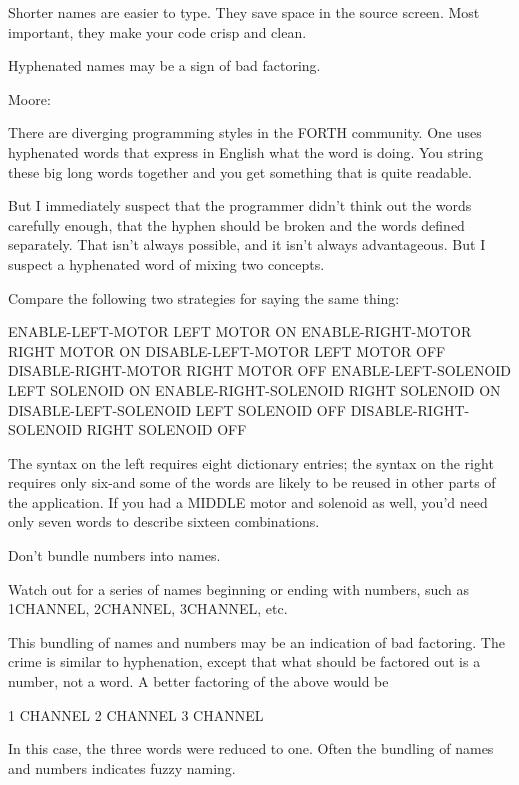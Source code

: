 Shorter names are easier to type.  They save space in the source
screen.  Most important, they make your code crisp and clean.

\begin{tip}
Hyphenated names may be a sign of bad factoring.
\end{tip}
Moore:

There are diverging programming styles in the FORTH community.  One
uses hyphenated words that express in English what the word is doing.
You string these big long words together and you get something that is
quite readable.

But I immediately suspect that the programmer didn't think out the words
carefully enough, that the hyphen should be broken and the words defined
separately.  That isn't always possible, and it isn't always advantageous.
But I suspect a hyphenated word of mixing two concepts.

Compare the following two strategies for saying the same thing:
\begin{Code}
ENABLE-LEFT-MOTOR        LEFT MOTOR ON
ENABLE-RIGHT-MOTOR       RIGHT MOTOR ON
DISABLE-LEFT-MOTOR       LEFT MOTOR OFF
DISABLE-RIGHT-MOTOR      RIGHT MOTOR OFF
ENABLE-LEFT-SOLENOID     LEFT SOLENOID ON
ENABLE-RIGHT-SOLENOID    RIGHT SOLENOID ON
DISABLE-LEFT-SOLENOID    LEFT SOLENOID OFF
DISABLE-RIGHT-SOLENOID   RIGHT SOLENOID OFF
\end{Code}
The syntax on the left requires eight dictionary entries; the syntax on the
right requires only six-and some of the words are likely to be reused in
other parts of the application.  If you had a MIDDLE motor and solenoid
as well, you'd need only seven words to describe sixteen combinations.

\begin{tip}
Don't bundle numbers into names.
\end{tip}
Watch out for a series of names beginning or ending with numbers, such
as 1CHANNEL, 2CHANNEL, 3CHANNEL, etc.

This bundling of names and numbers may be an indication of bad
factoring.  The crime is similar to hyphenation, except that what should
be factored out is a number, not a word.  A better factoring of the above
would be
\begin{Code}
1 CHANNEL
2 CHANNEL
3 CHANNEL
\end{Code}
In this case, the three words were reduced to one.
Often the bundling of names and numbers indicates fuzzy naming.

